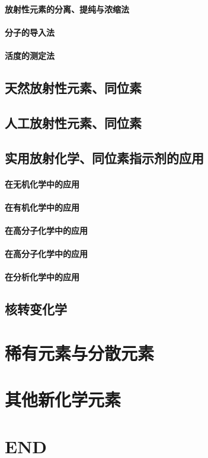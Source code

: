 \documentclass[UTF8]{../03-Chemistry}
\begin{document}
    \subsubsection{放射性元素的分离、提纯与浓缩法}
    \subsubsection{分子的导入法}
    \subsubsection{活度的测定法}
\section{天然放射性元素、同位素}
\section{人工放射性元素、同位素}
\section{实用放射化学、同位素指示剂的应用}
    \subsubsection{在无机化学中的应用}
    \subsubsection{在有机化学中的应用}
    \subsubsection{在高分子化学中的应用}
    \subsubsection{在高分子化学中的应用}
    \subsubsection{在分析化学中的应用}
\section{核转变化学}



\chapter{稀有元素与分散元素}


\chapter{其他新化学元素}


\chapter{END}
\end{document}
